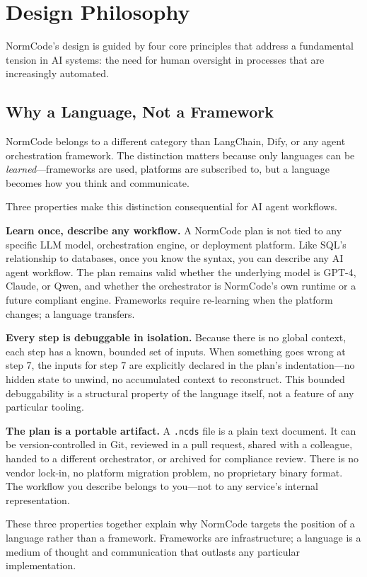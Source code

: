 \section{Design Philosophy}

NormCode's design is guided by four core principles that address a fundamental tension in AI systems: the need for human oversight in processes that are increasingly automated.

\subsection{Why a Language, Not a Framework}

NormCode belongs to a different category than LangChain, Dify, or any agent orchestration framework. The distinction matters because only languages can be \textit{learned}---frameworks are used, platforms are subscribed to, but a language becomes how you think and communicate.

Three properties make this distinction consequential for AI agent workflows.

\textbf{Learn once, describe any workflow.} A NormCode plan is not tied to any specific LLM model, orchestration engine, or deployment platform. Like SQL's relationship to databases, once you know the syntax, you can describe any AI agent workflow. The plan remains valid whether the underlying model is GPT-4, Claude, or Qwen, and whether the orchestrator is NormCode's own runtime or a future compliant engine. Frameworks require re-learning when the platform changes; a language transfers.

\textbf{Every step is debuggable in isolation.} Because there is no global context, each step has a known, bounded set of inputs. When something goes wrong at step 7, the inputs for step 7 are explicitly declared in the plan's indentation---no hidden state to unwind, no accumulated context to reconstruct. This bounded debuggability is a structural property of the language itself, not a feature of any particular tooling.

\textbf{The plan is a portable artifact.} A \texttt{.ncds} file is a plain text document. It can be version-controlled in Git, reviewed in a pull request, shared with a colleague, handed to a different orchestrator, or archived for compliance review. There is no vendor lock-in, no platform migration problem, no proprietary binary format. The workflow you describe belongs to you---not to any service's internal representation.

These three properties together explain why NormCode targets the position of a language rather than a framework. Frameworks are infrastructure; a language is a medium of thought and communication that outlasts any particular implementation.

